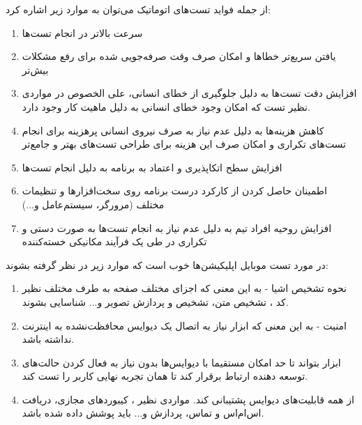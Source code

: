 {از جمله فواید تست‌های اتوماتیک می‌توان به موارد زیر اشاره کرد:

\begin{enumerate}
	\item 
	سرعت بالاتر در انجام تست‌ها
	
	\item 
	یافتن سریع‌تر خطاها و امکان صرف وقت صرفه‌جویی شده برای رفع مشکلات بیش‌تر
	
	\item 
	افزایش دقت تست‌ها به دلیل جلوگیری از خطای انسانی، علی الخصوص در مواردی نظیر تست  که امکان وجود خطای انسانی به دلیل ماهیت کار وجود دارد.
	
	\item 
	کاهش هزینه‌ها به دلیل عدم نیاز به صرف نیروی انسانی پرهزینه برای انجام تست‌های تکراری و امکان صرف این هزینه برای طراحی تست‌های بهتر و جامع‌تر
	
	\item 
	افزایش سطح اتکاپذیری و اعتماد به برنامه به دلیل انجام تست‌ها
	
	\item 
	اطمینان حاصل کردن از کارکرد درست برنامه روی سخت‌افزار‌ها و تنظیمات مختلف (مرورگر، سیستم‌عامل و...)
	
	\item 
	افزایش روحیه افراد تیم به دلیل عدم نیاز به انجام تست‌ها به صورت دستی و تکراری در طی یک فرآیند مکانیکی خسته‌کننده
	
\end{enumerate}

در مورد تست موبایل اپلیکیشن‌ها خوب است که موارد زیر در نظر گرفته بشوند:

\begin{enumerate}
	
	\item
	نحوه تشخیص اشیا - به این معنی که اجزای مختلف صفحه به طرف مختلف نظیر کد ، تشخیص متن، تشخیص و پردازش تصویر و... شناسایی بشوند.
	
	\item 
	امنیت - به این معنی که ابزار نیاز به 	اتصال یک دیوایس محافظت‌نشده به اینترنت نداشته باشد.
	
	\item 
	ابزار بتواند تا حد امکان مستقیما با دیوایس‌ها بدون نیاز به فعال کردن حالت‌های توسعه دهنده ارتباط برقرار کند تا همان تجربه نهایی کاربر را تست کند.
	
	\item 
	از همه قابلیت‌های دیوایس پشتیبانی کند. مواردی نظیر ، کیبوردهای مجازی، دریافت اس‌ام‌اس و تماس، پردازش  و... باید پوشش داده شده باشد.
	

\end{enumerate}}
